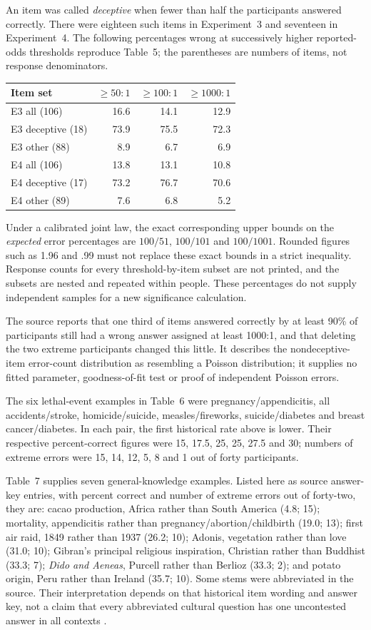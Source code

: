 An item was called \emph{deceptive} when fewer than half the participants
answered correctly. There were eighteen such items in Experiment~3 and
seventeen in Experiment~4. The following percentages wrong at successively
higher reported-odds thresholds reproduce Table~5; the parentheses are
numbers of items, not response denominators.
\begin{center}\small
\begin{tabular}{lrrr}
Item set&\(\geq50:1\)&\(\geq100:1\)&\(\geq1000:1\)\\\hline
E3 all (106)&16.6&14.1&12.9\\
E3 deceptive (18)&73.9&75.5&72.3\\
E3 other (88)&8.9&6.7&6.9\\
E4 all (106)&13.8&13.1&10.8\\
E4 deceptive (17)&73.2&76.7&70.6\\
E4 other (89)&7.6&6.8&5.2
\end{tabular}
\end{center}
Under a calibrated joint law, the exact corresponding upper bounds on the
\emph{expected} error percentages are \(100/51\), \(100/101\) and
\(100/1001\). Rounded figures such as 1.96 and .99 must not replace
these exact bounds in a strict inequality. Response counts for every
threshold-by-item subset are not printed, and the subsets are nested and
repeated within people. These percentages do not supply independent samples
for a new significance calculation.

The source reports that one third of items answered correctly by at least
90\% of participants still had a wrong answer assigned at least 1000:1,
and that deleting the two extreme participants changed this little. It
describes the nondeceptive-item error-count distribution as resembling a
Poisson distribution; it supplies no fitted parameter, goodness-of-fit test
or proof of independent Poisson errors.

The six lethal-event examples in Table~6 were pregnancy/appendicitis,
all accidents/stroke, homicide/suicide, measles/fireworks, suicide/diabetes
and breast cancer/diabetes. In each pair, the first historical rate above
is lower. Their respective percent-correct figures were
15, 17.5, 25, 25, 27.5 and 30; numbers of extreme errors were
15, 14, 12, 5, 8 and 1 out of forty participants.

Table~7 supplies seven general-knowledge examples. Listed here as source
answer-key entries, with percent correct and number of extreme errors out
of forty-two, they are: cacao production, Africa rather than South America
(4.8; 15); mortality, appendicitis rather than pregnancy/abortion/childbirth
(19.0; 13); first air raid, 1849 rather than 1937 (26.2; 10); Adonis,
vegetation rather than love (31.0; 10); Gibran's principal religious
inspiration, Christian rather than Buddhist (33.3; 7); \emph{Dido and
Aeneas}, Purcell rather than Berlioz (33.3; 2); and potato origin, Peru
rather than Ireland (35.7; 10). Some stems were abbreviated in the source.
Their interpretation depends on that historical item wording and answer key,
not a claim that every abbreviated cultural question has one uncontested
answer in all contexts \cite[p.~562]{FischhoffSlovicLichtenstein1977Certainty}.

